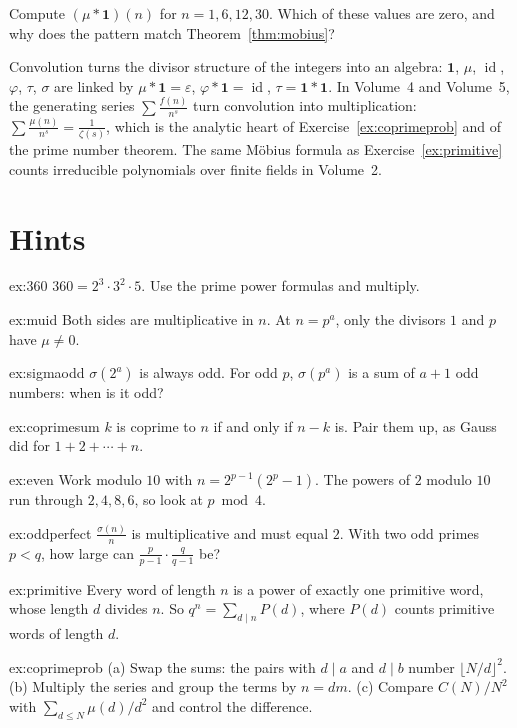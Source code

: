 \begin{exercise}[$\star$]\label{ex:t1-mu12}
Compute $(\mu*\mathbf 1)(n)$ for $n=1,6,12,30$. Which of these values are zero, and why does the pattern match Theorem~\ref{thm:mobius}?
\end{exercise}

\begin{beauty}
Convolution turns the divisor structure of the integers into an algebra: $\mathbf 1$, $\mu$, $\operatorname{id}$, $\varphi$, $\tau$, $\sigma$ are linked by $\mu*\mathbf 1=\varepsilon$, $\varphi*\mathbf 1=\operatorname{id}$, $\tau=\mathbf 1*\mathbf 1$. In Volume~4 and Volume~5, the generating series $\sum\frac{f(n)}{n^s}$ turn convolution into multiplication: $\sum\frac{\mu(n)}{n^s}=\frac1{\zeta(s)}$, which is the analytic heart of Exercise~\ref{ex:coprimeprob} and of the prime number theorem. The same M\"obius formula as Exercise~\ref{ex:primitive} counts irreducible polynomials over finite fields in Volume~2.
\end{beauty}

\section{Hints}

\begin{hint}{ex:360}
$360=2^3\cdot3^2\cdot5$. Use the prime power formulas and multiply.
\end{hint}
\begin{hint}{ex:muid}
Both sides are multiplicative in $n$. At $n=p^a$, only the divisors $1$ and $p$ have $\mu\ne0$.
\end{hint}
\begin{hint}{ex:sigmaodd}
$\sigma(2^a)$ is always odd. For odd $p$, $\sigma(p^a)$ is a sum of $a+1$ odd numbers: when is it odd?
\end{hint}
\begin{hint}{ex:coprimesum}
$k$ is coprime to $n$ if and only if $n-k$ is. Pair them up, as Gauss did for $1+2+\cdots+n$.
\end{hint}
\begin{hint}{ex:even}
Work modulo $10$ with $n=2^{p-1}(2^p-1)$. The powers of $2$ modulo $10$ run through $2,4,8,6$, so look at $p\bmod4$.
\end{hint}
\begin{hint}{ex:oddperfect}
$\frac{\sigma(n)}n$ is multiplicative and must equal $2$. With two odd primes $p<q$, how large can $\frac p{p-1}\cdot\frac q{q-1}$ be?
\end{hint}
\begin{hint}{ex:primitive}
Every word of length $n$ is a power of exactly one primitive word, whose length $d$ divides $n$. So $q^n=\sum_{d\mid n}P(d)$, where $P(d)$ counts primitive words of length $d$.
\end{hint}
\begin{hint}{ex:coprimeprob}
(a) Swap the sums: the pairs with $d\mid a$ and $d\mid b$ number $\lfloor N/d\rfloor^2$. (b) Multiply the series and group the terms by $n=dm$. (c) Compare $C(N)/N^2$ with $\sum_{d\le N}\mu(d)/d^2$ and control the difference.
\end{hint}

